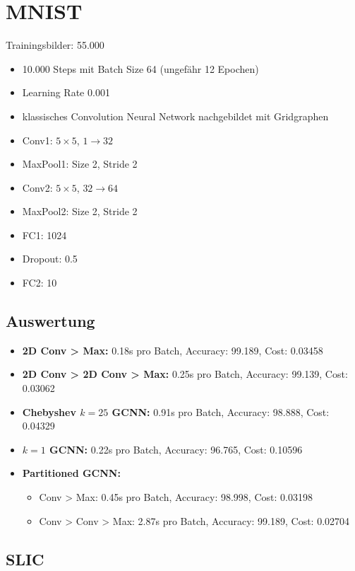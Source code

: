 \section{MNIST}

Trainingsbilder: 55.000

\begin{itemize}
  \item 10.000 Steps mit Batch Size 64 (ungefähr 12 Epochen)
  \item Learning Rate 0.001
  \item klassisches Convolution Neural Network nachgebildet mit Gridgraphen
  \item Conv1: $5 \times 5$, $1 \rightarrow 32$
  \item MaxPool1: Size 2, Stride 2
  \item Conv2: $5 \times 5$, $32 \rightarrow 64$
  \item MaxPool2: Size 2, Stride 2
  \item FC1: 1024
  \item Dropout: 0.5
  \item FC2: 10
\end{itemize}

\subsection{Auswertung}

\begin{itemize}
  \item \textbf{2D Conv > Max:} 0.18s pro Batch, Accuracy: 99.189, Cost: 0.03458
  \item \textbf{2D Conv > 2D Conv > Max:} 0.25s pro Batch, Accuracy: 99.139, Cost: 0.03062
  \item \textbf{Chebyshev $k=25$ GCNN:} 0.91s pro Batch, Accuracy: 98.888, Cost: 0.04329
  \item \textbf{$k=1$ GCNN:} 0.22s pro Batch, Accuracy: 96.765, Cost: 0.10596
  \item \textbf{Partitioned GCNN:}
  \begin{itemize}
    \item Conv > Max: 0.45s pro Batch, Accuracy: 98.998, Cost: 0.03198
    \item Conv > Conv > Max: 2.87s pro Batch, Accuracy: 99.189, Cost: 0.02704
  \end{itemize}
\end{itemize}

\subsection{SLIC}

